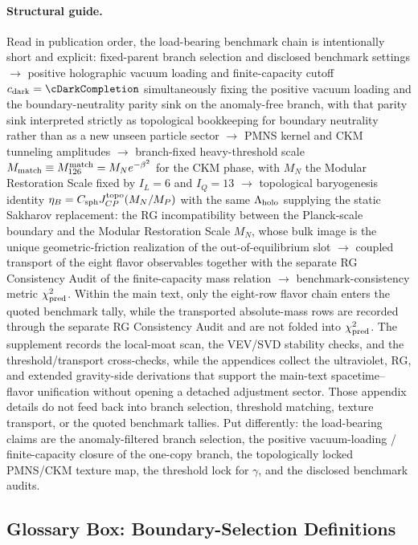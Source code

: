 \documentclass[11pt]{article}
\begin{document}
\paragraph{Structural guide.}
Read in publication order, the load-bearing benchmark chain is intentionally
short and explicit: fixed-parent branch selection and disclosed benchmark
settings $\to$ positive holographic vacuum loading and finite-capacity cutoff
$c_{\rm dark}=\cDarkCompletion$ simultaneously fixing the positive vacuum
loading and the boundary-neutrality parity sink on the anomaly-free branch,
with that parity sink interpreted strictly as topological bookkeeping for
boundary neutrality rather than as a new unseen particle sector
$\to$ PMNS kernel and CKM tunneling amplitudes
$\to$ branch-fixed heavy-threshold scale
$M_{\rm match}\equiv M_{126}^{\rm match}=M_Ne^{-\beta^2}$ for the CKM phase,
with $M_N$ the Modular Restoration Scale fixed by $I_L=6$ and $I_Q=13$
$\to$ topological baryogenesis identity
$\eta_B=C_{\rm sph}J_{CP}^{\rm topo}(M_N/M_P)$ with the same
$\Lambda_{\rm holo}$ supplying the static Sakharov replacement: the RG
incompatibility between the Planck-scale boundary and the Modular Restoration
Scale $M_N$,
whose bulk image is the unique geometric-friction realization of the
out-of-equilibrium slot $\to$ coupled transport of the eight flavor
observables together with the separate RG Consistency Audit of the
finite-capacity mass relation $\to$ benchmark-consistency metric
$\chi_{\rm pred}^2$. Within the main text, only
the eight-row flavor chain enters the quoted benchmark tally, while the
transported absolute-mass rows are recorded through the separate RG
Consistency Audit and are not folded into $\chi_{\rm pred}^2$. The supplement
records the local-moat scan, the VEV/SVD stability checks, and the
threshold/transport cross-checks, while the appendices collect the
ultraviolet, RG, and extended gravity-side derivations that support the
main-text spacetime--flavor unification without opening a detached adjustment
sector. Those appendix details do not feed back into branch selection,
threshold matching, texture transport, or the quoted benchmark tallies. Put
differently: the load-bearing claims are the
anomaly-filtered branch selection, the positive vacuum-loading /
finite-capacity closure of the one-copy branch, the topologically locked
PMNS/CKM texture map, the threshold lock for $\gamma$, and the disclosed
benchmark audits.

\subsection*{Glossary Box: Boundary-Selection Definitions}
\end{document}

